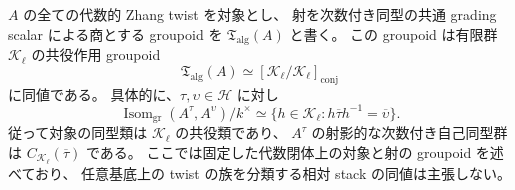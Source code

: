 \begin{theorem}
\label{mbr:thm:algebraic-twist-groupoid}
$A$ の全ての代数的 Zhang twist を対象とし、
射を次数付き同型の共通 grading scalar による商とする groupoid を
$\mathfrak T_{\mathrm{alg}}(A)$ と書く。
この groupoid は有限群 $\mathcal K_\ell$ の共役作用 groupoid
\begin{equation}\label{mbr:eq:conjugacy-groupoid}
 \mathfrak T_{\mathrm{alg}}(A)\simeq
 [\mathcal K_\ell/\mathcal K_\ell]_{\mathrm{conj}}
\end{equation}
に同値である。
具体的に、$\tau,\upsilon\in\mathcal H$ に対し
\begin{equation}\label{mbr:eq:twist-isom}
 \operatorname{Isom}_{\mathrm{gr}}(A^\tau,A^\upsilon)/k^\times
 \simeq
 \{h\in\mathcal K_\ell:
            h\overline\tau h^{-1}=\overline\upsilon\}.
\end{equation}
従って対象の同型類は $\mathcal K_\ell$ の共役類であり、
$A^\tau$ の射影的な次数付き自己同型群は
$C_{\mathcal K_\ell}(\overline\tau)$ である。
ここでは固定した代数閉体上の対象と射の groupoid を述べており、
任意基底上の twist の族を分類する相対 stack の同値は主張しない。
\end{theorem}

